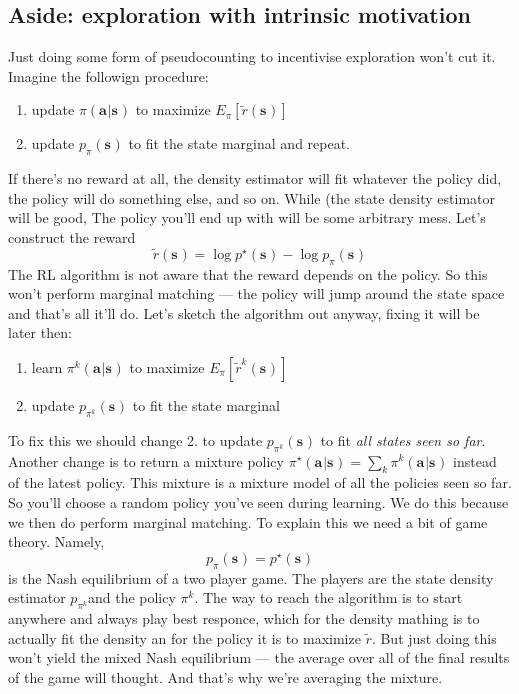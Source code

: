 \documentclass{report}
\begin{document}
\subsection{Aside: exploration with intrinsic motivation}
Just doing some form of pseudocounting to incentivise exploration won't cut it.
Imagine the followign procedure:
\begin{enumerate}
		\item update $ \pi(\bm{a}_{}|\bm{s}_{})  $ to maximize $ E_\pi \left[ \tilde{r}(\bm{s}_{}) \right]   $
		\item update $ p_\pi(\bm{s}_{})  $ to fit the state marginal and repeat.
\end{enumerate}
If there's no reward at all, the density estimator will fit whatever the policy did,
the policy will do something else, and so on.
While (the state density estimator will be good,
The policy you'll end up with will be some arbitrary mess.
Let's construct the reward
\begin{equation}
		\tilde{r}(\bm{s}_{}) = \log p^\star (\bm{s}_{}) - \log p_\pi (\bm{s}_{})
\end{equation}
The RL algorithm is not aware that the reward depends on the policy.
So this won't perform marginal matching --- 
the policy will jump around the state space and that's all it'll do.
Let's sketch the algorithm out anyway, fixing it will be later then:
\begin{enumerate}
		\item learn $ \pi^k (\bm{a}_{}|\bm{s}_{})  $ to maximize $ E_\pi \left[ \tilde{r}^k(\bm{s}_{}) \right]   $
		\item update $ p_{\pi^k}(\bm{s}_{})  $ to fit the state marginal
\end{enumerate}
To fix this we should change 2. to
update $ p_{\pi^k}(\bm{s}_{})  $ to fit \textit{all states seen so far}.
Another change is to return a mixture policy $ \pi^\star (\bm{a}_{}|\bm{s}_{})  = \sum_{k}^{} \pi^k(\bm{a}_{}|\bm{s}_{}) $
instead of the latest policy.
This mixture is a mixture model of all the policies seen so far.
So you'll choose a random policy you've seen during learning.
We do this because we then do perform marginal matching.
To explain this we need a bit of game theory.
Namely,
\begin{equation}
		p_\pi(\bm{s}_{}) = p^\star (\bm{s}_{}) 
\end{equation}
is the Nash equilibrium of a two player game.
The players are the state density estimator $ p_{\pi^k}  $and the policy $\pi^k$.
The way to reach the algorithm is to start anywhere and always play best responce,
which for the density mathing is to actually fit the density an for the policy
it is to maximize $ \tilde{r}  $.
But just doing this won't yield the mixed Nash equilibrium --- the average over all
of the final results of the game will thought.
And that's why we're averaging the mixture.
\end{document}
